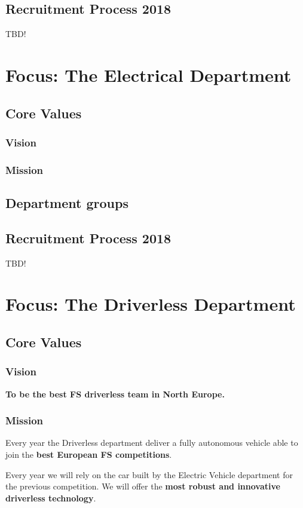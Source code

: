 \documentclass[graybox]{svmult}
\begin{document}
\subsection{Recruitment Process 2018}
TBD!

\section{Focus: The Electrical Department}
\label{sec:5}
\subsection{Core Values}
\subsubsection{Vision}
\subsubsection{Mission}
\subsection{Department groups}
\subsection{Recruitment Process 2018}
TBD!

\section{Focus: The Driverless Department}
\label{sec:6}
\subsection{Core Values}
\subsubsection*{Vision}
\begin{center}
\large{{\textbf{To be the best FS driverless team in North Europe.}}}
\end{center}
\subsubsection*{Mission}
Every year the Driverless department deliver a fully autonomous vehicle able to join the \textbf{best European FS competitions}.

Every year we will rely on the car built by the Electric Vehicle department for the previous competition.
We will offer the \textbf{most robust and innovative driverless technology}.
\end{document}

